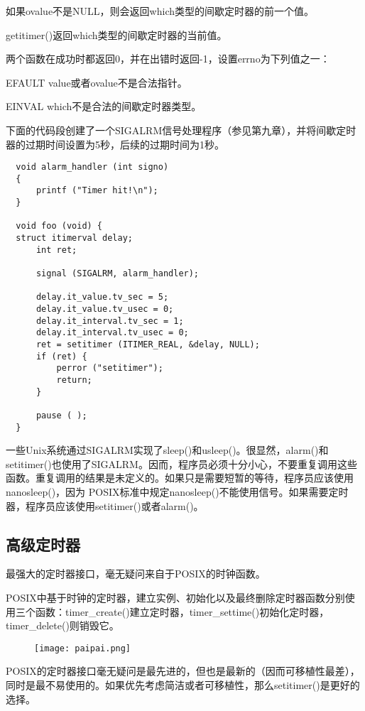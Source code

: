 如果ovalue不是NULL，则会返回which类型的间歇定时器的前一个值。

getitimer()返回which类型的间歇定时器的当前值。

两个函数在成功时都返回0，并在出错时返回-1，设置errno为下列值之一： 

\begin{eqlist*}
\item [EFAULT]
value或者ovalue不是合法指针。
\item [EINVAL]
which不是合法的间歇定时器类型。
\end{eqlist*}

下面的代码段创建了一个SIGALRM信号处理程序（参见第九章），并将间歇定时器的过期时间设置为5秒，后续的过期时间为1秒。 

\begin{lstlisting}
  void alarm_handler (int signo)
  {
      printf ("Timer hit!\n");
  }

  void foo (void) {
  struct itimerval delay;
      int ret;

      signal (SIGALRM, alarm_handler);

      delay.it_value.tv_sec = 5;
      delay.it_value.tv_usec = 0;
      delay.it_interval.tv_sec = 1;
      delay.it_interval.tv_usec = 0;
      ret = setitimer (ITIMER_REAL, &delay, NULL);
      if (ret) {
          perror ("setitimer");
          return;
      }

      pause ( );
  }
\end{lstlisting}

一些Unix系统通过SIGALRM实现了sleep()和usleep()。很显然，alarm()和setitimer()也使用了SIGALRM。因而，程序员必须十分小心，不要重复调用这些函数。重复调用的结果是未定义的。如果只是需要短暂的等待，程序员应该使用nanosleep()，因为 POSIX标准中规定nanosleep()不能使用信号。如果需要定时器，程序员应该使用setitimer()或者alarm()。 

\subsection{高级定时器}

最强大的定时器接口，毫无疑问来自于POSIX的时钟函数。

POSIX中基于时钟的定时器，建立实例、初始化以及最终删除定时器函数分别使用三个函数：timer\_create()建立定时器，timer\_settime()初始化定时器，timer\_delete()则销毁它。 

\begin{wrapfigure}{l}{2.5cm}
  \texttt{[image: paipai.png]}
\end{wrapfigure}
\mbox{}POSIX的定时器接口毫无疑问是最先进的，但也是最新的（因而可移植性最差），同时是最不易使用的。如果优先考虑简洁或者可移植性，那么setitimer()是更好的选择。 


